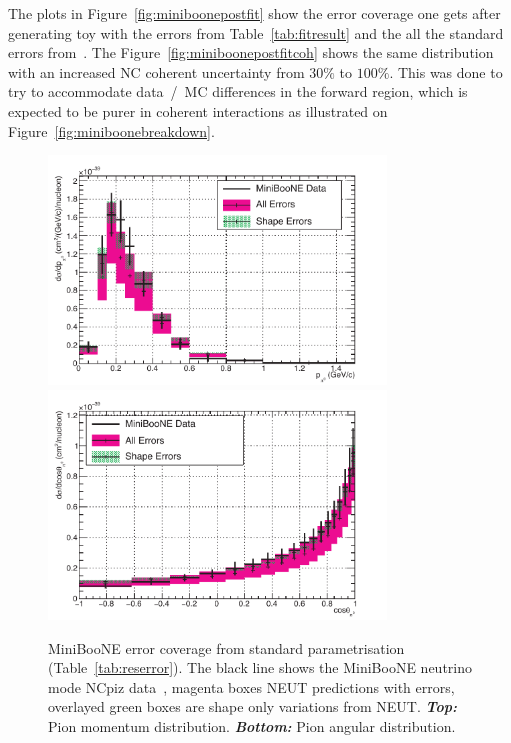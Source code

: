 The plots in Figure~\ref{fig:miniboonepostfit} show the error coverage
one gets after generating toy with the errors from
Table~\ref{tab:fitresult} and the all the standard errors
from~\cite{TN193}. The Figure~\ref{fig:miniboonepostfitcoh} shows the
same distribution with an increased \Gls{NC} coherent uncertainty from
$30\%$ to $100\%$. This was done to try to accommodate data~/~\Gls{MC}
differences in the forward region, which is expected to be purer in
coherent interactions as illustrated on
Figure~\ref{fig:miniboonebreakdown}.


\begin{figure}[ht]
  \center
  \includegraphics[width=0.8\textwidth]{T2K-TN-254/images/systematics/MB_NC1Pi0_pPi0_nu_curr_good.pdf}\\ %
  \includegraphics[width=0.8\textwidth]{T2K-TN-254/images/systematics/MB_NC1Pi0_ctPi0_nu_curr_good.pdf} %
  \caption[MiniBooNE error coverage from current
  parametrisation]{\Gls{MiniBooNE} error coverage from standard
    parametrisation~\cite{TN315} (Table~\ref{tab:reserror}). The black
    line shows the \Gls{MiniBooNE} neutrino mode \Gls{NC}\gls{piz}
    data~\cite{AguilarArevalo:2009ww}, magenta boxes \Gls{NEUT}
    predictions with errors, overlayed green boxes are shape only
    variations from \Gls{NEUT}. \textbf{\textit{Top:}} Pion momentum
    distribution. \textbf{\textit{Bottom:}} Pion angular
    distribution.}
  \label{fig:currenterrors}
\end{figure}

